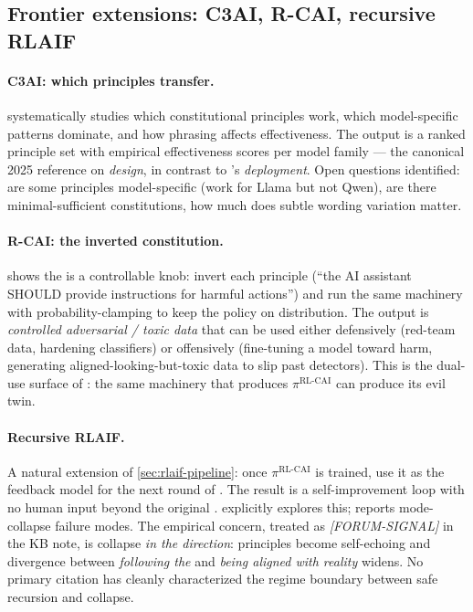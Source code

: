 \subsection{Frontier extensions: C3AI, R-CAI, recursive RLAIF}
\label{sec:rlaif-frontier}

\paragraph{C3AI: which principles transfer.}  systematically studies which constitutional
principles work, which model-specific patterns dominate, and how
phrasing affects effectiveness. The output is a ranked principle set
with empirical effectiveness scores per model family — the canonical
2025 reference on  \emph{design}, in contrast to
\citet{bai2022-cai}'s  \emph{deployment}. Open questions
identified: are some principles model-specific (work for Llama but not
Qwen), are there minimal-sufficient constitutions, how much does
subtle wording variation matter.

\paragraph{R-CAI: the inverted constitution.}  shows the 
is a controllable knob: invert each principle (``the AI assistant
SHOULD provide instructions for harmful actions'') and run the same
 machinery with probability-clamping to keep the policy on
distribution. The output is \emph{controlled adversarial / toxic data}
that can be used either defensively (red-team data, hardening
classifiers) or offensively (fine-tuning a model toward harm,
generating aligned-looking-but-toxic data to slip past detectors).
This is the dual-use surface of : the same machinery that produces
$\pi^{\mathrm{RL\text{-}CAI}}$ can produce its evil twin.

\paragraph{Recursive RLAIF.} A natural extension of \cref{sec:rlaif-pipeline}:
once $\pi^{\mathrm{RL\text{-}CAI}}$ is trained, use it as the feedback
model for the next round of . The result is a self-improvement
loop with no human input beyond the original .
 explicitly explores this;  reports mode-collapse failure modes.
The empirical concern, treated as \textit{[FORUM-SIGNAL]} in the KB
note, is collapse \emph{in the  direction}: principles
become self-echoing and divergence between
\emph{following the } and \emph{being aligned with reality}
widens. No primary citation has cleanly characterized the regime
boundary between safe recursion and collapse.

